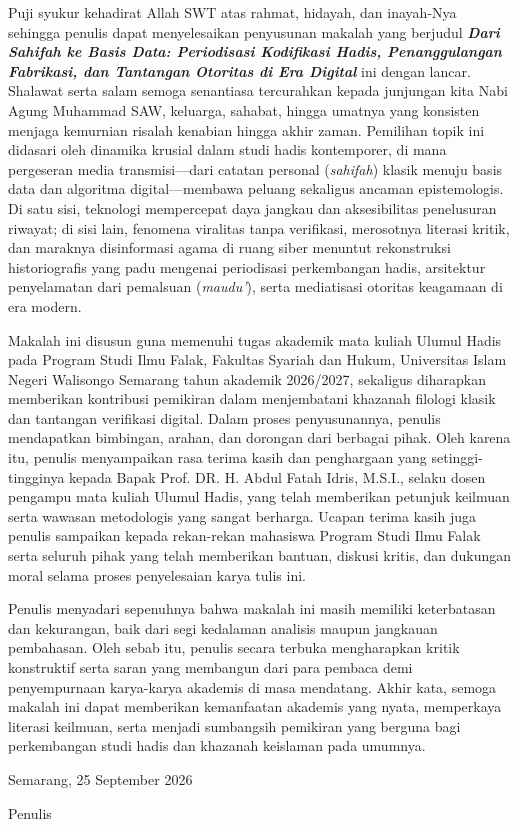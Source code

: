 
Puji syukur kehadirat Allah SWT atas rahmat, hidayah, dan inayah-Nya sehingga penulis dapat menyelesaikan penyusunan makalah yang berjudul \textbf{\textit{Dari Sahifah ke Basis Data: Periodisasi Kodifikasi Hadis, Penanggulangan Fabrikasi, dan Tantangan Otoritas di Era Digital}} ini dengan lancar. Shalawat serta salam semoga senantiasa tercurahkan kepada junjungan kita Nabi Agung Muhammad SAW, keluarga, sahabat, hingga umatnya yang konsisten menjaga kemurnian risalah kenabian hingga akhir zaman. Pemilihan topik ini didasari oleh dinamika krusial dalam studi hadis kontemporer, di mana pergeseran media transmisi---dari catatan personal (\textit{sahifah}) klasik menuju basis data dan algoritma digital---membawa peluang sekaligus ancaman epistemologis. Di satu sisi, teknologi mempercepat daya jangkau dan aksesibilitas penelusuran riwayat; di sisi lain, fenomena viralitas tanpa verifikasi, merosotnya literasi kritik, dan maraknya disinformasi agama di ruang siber menuntut rekonstruksi historiografis yang padu mengenai periodisasi perkembangan hadis, arsitektur penyelamatan dari pemalsuan (\textit{maudu'}), serta mediatisasi otoritas keagamaan di era modern.

Makalah ini disusun guna memenuhi tugas akademik mata kuliah Ulumul Hadis pada Program Studi Ilmu Falak, Fakultas Syariah dan Hukum, Universitas Islam Negeri Walisongo Semarang tahun akademik 2026/2027, sekaligus diharapkan memberikan kontribusi pemikiran dalam menjembatani khazanah filologi klasik dan tantangan verifikasi digital. Dalam proses penyusunannya, penulis mendapatkan bimbingan, arahan, dan dorongan dari berbagai pihak. Oleh karena itu, penulis menyampaikan rasa terima kasih dan penghargaan yang setinggi-tingginya kepada Bapak Prof. DR. H. Abdul Fatah Idris, M.S.I., selaku dosen pengampu mata kuliah Ulumul Hadis, yang telah memberikan petunjuk keilmuan serta wawasan metodologis yang sangat berharga. Ucapan terima kasih juga penulis sampaikan kepada rekan-rekan mahasiswa Program Studi Ilmu Falak serta seluruh pihak yang telah memberikan bantuan, diskusi kritis, dan dukungan moral selama proses penyelesaian karya tulis ini.

Penulis menyadari sepenuhnya bahwa makalah ini masih memiliki keterbatasan dan kekurangan, baik dari segi kedalaman analisis maupun jangkauan pembahasan. Oleh sebab itu, penulis secara terbuka mengharapkan kritik konstruktif serta saran yang membangun dari para pembaca demi penyempurnaan karya-karya akademis di masa mendatang. Akhir kata, semoga makalah ini dapat memberikan kemanfaatan akademis yang nyata, memperkaya literasi keilmuan, serta menjadi sumbangsih pemikiran yang berguna bagi perkembangan studi hadis dan khazanah keislaman pada umumnya.

Semarang, 25 September 2026

Penulis

